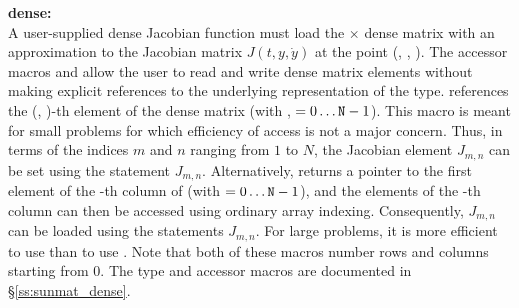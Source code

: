 {{  {\bf dense:}\\
  A user-supplied dense Jacobian function must load the  $\times$ 
  dense matrix  with an approximation to the Jacobian matrix $J(t,y,\dot{y})$
  at the point (, , ).  The accessor macros 
  and  allow the user to read and write dense matrix
  elements without making explicit references to the underlying
  representation of the {\sunmatdense} type.
   references the (, )-th
  element of the dense matrix  (with , $= 0\ldots
  {\tt N}-1$). This macro is meant for small problems for which efficiency
  of access is not a major concern.  Thus, in terms of the indices $m$
  and $n$ ranging from $1$ to $N$, the Jacobian element $J_{m,n}$ can
  be set using the statement 
  $J_{m,n}$.  Alternatively,  returns a
  pointer to the first element of the -th column of 
  (with $= 0\ldots {\tt N}-1$), and the elements of the -th column
  can then be accessed using ordinary array indexing.  Consequently,
  $J_{m,n}$ can be loaded using the statements
    $J_{m,n}$.
  For large problems, it is more efficient to use 
  than to use .  Note that both of these macros
  number rows and columns starting from $0$.  The {\sunmatdense} type
  and accessor macros are documented in \S\ref{ss:sunmat_dense}.

}}
